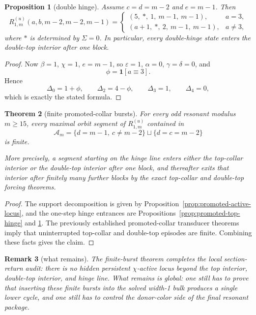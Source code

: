 \documentclass[11pt]{article}
\newtheorem{theorem}{Theorem}[section]
\newtheorem{proposition}[theorem]{Proposition}
\newtheorem{remark}[theorem]{Remark}
\begin{document}
\begin{proposition}[double hinge]
\label{prop:promoted-double-hinge}
Assume \(c=d=m-2\) and \(e=m-1\). Then
\[
R^{(u)}_{1,m}(a,b,m-2,m-2,m-1)
=
\begin{cases}
(5,\ *,\ 1,\ m-1,\ m-1), & a=3,\\[1mm]
(a+1,\ *,\ 2,\ m-1,\ m-1), & a\neq 3,
\end{cases}
\]
where \(*\) is determined by \(\Sigma=0\). In particular, every double-hinge state enters the double-top interior after one block.
\end{proposition}

\begin{proof}
Now \(\beta=1\), \(\chi=1\), \(e=m-1\), so \(\varepsilon=1\), \(\alpha=0\), \(\gamma=\delta=0\), and
\[
\phi=\mathbf 1[a\equiv 3].
\]
Hence
\[
\Delta_0=1+\phi,\qquad \Delta_2=4-\phi,\qquad \Delta_3=1,\qquad \Delta_4=0,
\]
which is exactly the stated formula.
\end{proof}

\begin{theorem}[finite promoted-collar bursts]
\label{thm:promoted-finite-bursts}
For every odd resonant modulus \(m\ge 15\), every maximal orbit segment of
\(R^{(u)}_{1,m}\) contained in
\[
\mathcal A_m
=
\{d=m-1,\ c\neq m-2\}\sqcup\{d=c=m-2\}
\]
is finite.

More precisely, a segment starting on the hinge line enters either the top-collar interior or the double-top interior after one block, and thereafter exits that interior after finitely many further blocks by the exact top-collar and double-top forcing theorems.
\end{theorem}

\begin{proof}
The support decomposition is given by Proposition~\ref{prop:promoted-active-locus}, and the one-step hinge entrances are Propositions~\ref{prop:promoted-top-hinge} and \ref{prop:promoted-double-hinge}. The previously established promoted-collar transducer theorems imply that uninterrupted top-collar and double-top episodes are finite. Combining these facts gives the claim.
\end{proof}

\begin{remark}[what remains]
The finite-burst theorem completes the local section-return audit: there is no hidden persistent \(\chi\)-active locus beyond the top interior, double-top interior, and hinge line. What remains is global: one still has to prove that inserting these finite bursts into the solved width-1 bulk produces a single lower cycle, and one still has to control the donor-color side of the final resonant package.
\end{remark}
\end{document}

